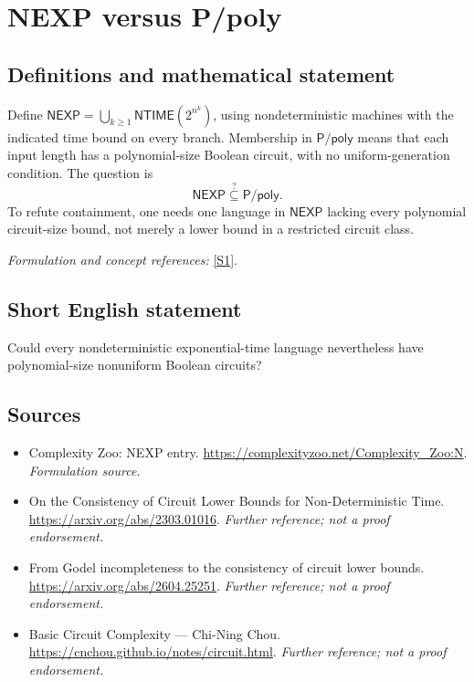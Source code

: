 \documentclass[11pt]{article}
\begin{document}
\section*{\texorpdfstring{NEXP versus P/poly}{NEXP versus P/poly}}\label{30006703}
\subsection{Definitions and mathematical statement}
Define $\mathsf{NEXP}=\bigcup_{k\ge1}\mathsf{NTIME}(2^{n^k})$, using nondeterministic machines with the indicated time bound on every branch. Membership in $\mathsf{P/poly}$ means that each input length has a polynomial-size Boolean circuit, with no uniform-generation condition. The question is
\[
 \mathsf{NEXP}\stackrel{?}{\subseteq}\mathsf{P/poly}.
\]
To refute containment, one needs one language in $\mathsf{NEXP}$ lacking every polynomial circuit-size bound, not merely a lower bound in a restricted circuit class.
\par\smallskip\textit{Formulation and concept references:} \href{https://complexityzoo.net/Complexity_Zoo:N}{[S1]}.

\subsection{Short English statement}
Could every nondeterministic exponential-time language nevertheless have polynomial-size nonuniform Boolean circuits?
\subsection{Sources}
\begin{itemize}
\item[S1]Complexity Zoo: NEXP entry.
\url{https://complexityzoo.net/Complexity_Zoo:N}.
\textit{Formulation source.}
\item[S2]On the Consistency of Circuit Lower Bounds for Non-Deterministic Time.
\url{https://arxiv.org/abs/2303.01016}.
\textit{Further reference; not a proof endorsement.}
\item[S3]From Godel incompleteness to the consistency of circuit lower bounds.
\url{https://arxiv.org/abs/2604.25251}.
\textit{Further reference; not a proof endorsement.}
\item[S4]Basic Circuit Complexity — Chi-Ning Chou.
\url{https://cnchou.github.io/notes/circuit.html}.
\textit{Further reference; not a proof endorsement.}
\end{itemize}
\end{document}
